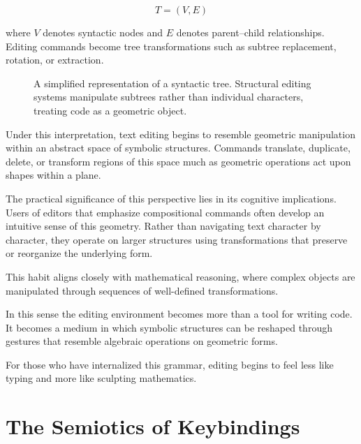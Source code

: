 \documentclass[11pt]{article}
\theoremstyle{definition}
\begin{document}
\[
T = (V, E)
\]

where $V$ denotes syntactic nodes and $E$ denotes parent–child
relationships. Editing commands become tree transformations such as
subtree replacement, rotation, or extraction.

\begin{figure}[h]
\centering
{}
\caption{A simplified representation of a syntactic tree. Structural
editing systems manipulate subtrees rather than individual characters,
treating code as a geometric object.}
\label{fig:syntax_tree}
\end{figure}

Under this interpretation, text editing begins to resemble geometric
manipulation within an abstract space of symbolic structures. Commands
translate, duplicate, delete, or transform regions of this space much
as geometric operations act upon shapes within a plane.

The practical significance of this perspective lies in its cognitive
implications. Users of editors that emphasize compositional commands
often develop an intuitive sense of this geometry. Rather than
navigating text character by character, they operate on larger
structures using transformations that preserve or reorganize the
underlying form.

This habit aligns closely with mathematical reasoning, where complex
objects are manipulated through sequences of well-defined
transformations.

In this sense the editing environment becomes more than a tool for
writing code. It becomes a medium in which symbolic structures can be
reshaped through gestures that resemble algebraic operations on
geometric forms.

For those who have internalized this grammar, editing begins to feel
less like typing and more like sculpting mathematics.

\section{The Semiotics of Keybindings}
\end{document}

